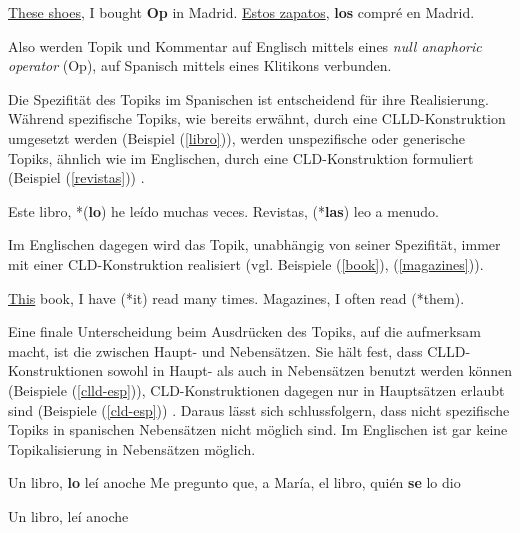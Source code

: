 \begin{exe}
    \ex \label{shoes} \uline{These shoes}, I bought \textbf{Op} in Madrid.
    \ex \label{zapatos} \uline{Estos zapatos}, \textbf{los} compré en Madrid.
\end{exe}

Also werden Topik und Kommentar auf Englisch mittels eines \textit{null anaphoric operator} (Op),
auf Spanisch mittels eines Klitikons verbunden.

Die Spezifität des Topiks im Spanischen ist entscheidend für ihre Realisierung.
Während spezifische Topiks, wie bereits erwähnt, durch eine CLLD-Konstruktion umgesetzt werden (Beispiel (\ref{libro})),
werden unspezifische oder generische Topiks, ähnlich wie im Englischen, durch eine CLD-Konstruktion formuliert (Beispiel (\ref{revistas})) \cite{Valenzuela05}.

\begin{exe}
    \ex \label{libro} Este libro, *(\textbf{lo}) he leído muchas veces.
    \ex \label{revistas} Revistas, (*\textbf{las}) leo a menudo.
\end{exe}

Im Englischen dagegen wird das Topik, unabhängig von seiner Spezifität, immer mit einer CLD-Konstruktion realisiert (vgl. Beispiele (\ref{book}), (\ref{magazines})).

\begin{exe}
    \ex \label{book} \uline{This} book, I have (*it) read many times.
    \ex \label{magazines} Magazines, I often read (*them).
\end{exe}

Eine finale Unterscheidung beim Ausdrücken des Topiks, auf die \cite{Valenzuela05} aufmerksam macht, ist die zwischen Haupt- und Nebensätzen.
Sie hält fest, dass CLLD-Konstruktionen sowohl in Haupt- als auch in Nebensätzen benutzt werden können (Beispiele (\ref{clld-esp})),
CLD-Konstruktionen dagegen nur in Hauptsätzen erlaubt sind (Beispiele (\ref{cld-esp})) \cite{Valenzuela05}.
Daraus lässt sich schlussfolgern, dass nicht spezifische Topiks in spanischen Nebensätzen nicht möglich sind.
Im Englischen ist gar keine Topikalisierung in Nebensätzen möglich.

\begin{exe}
    \ex \label{clld-esp} \begin{xlist}
        \ex Un libro, \textbf{lo} leí anoche
        \ex Me pregunto que, a María, el libro, quién \textbf{se} lo dio
        \end{xlist}
    \ex \label{cld-esp} \begin{xlist}
        \ex Un libro, leí anoche
        \end{xlist}
\end{exe}

